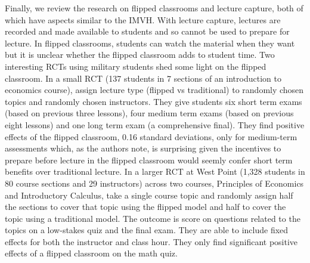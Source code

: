 \documentclass[12pt]{article}
\begin{document}
Finally, we review the research on flipped classrooms and lecture capture, both of which have aspects similar to the IMVH. With lecture capture, lectures are recorded and made available to students and so cannot be used to prepare for lecture. In flipped classrooms, students can watch the material when they want but it is unclear whether the flipped classroom adds to student time. Two interesting RCTs using military students shed some light on the flipped classroom. In a small RCT (137 students in 7 sections of an introduction to economics course), \textcite{wbi2018} assign lecture type (flipped vs traditional) to randomly chosen topics and randomly chosen instructors. They give students six short term exams (based on previous three lessons), four medium term exams (based on previous eight lessons) and one long term exam (a comprehensive final). They find positive effects of the flipped classroom, 0.16 standard deviations, only for medium-term assessments which, as the authors note, is surprising given the incentives to prepare before lecture in the flipped classroom would seemly confer short term benefits over traditional lecture. In a larger RCT at West Point (1,328 students in 80 course sections and 29 instructors) across two courses, Principles of Economics and Introductory Calculus, \textcite{sgmy2021} take a single course topic and randomly assign half the sections to cover that topic using the flipped model and half to cover the topic using a traditional model. The outcome is score on questions related to the topics on a low-stakes quiz and the final exam. They are able to include fixed effects for both the instructor and class hour. They only find significant positive effects of a flipped classroom on the math quiz.



\end{document}
